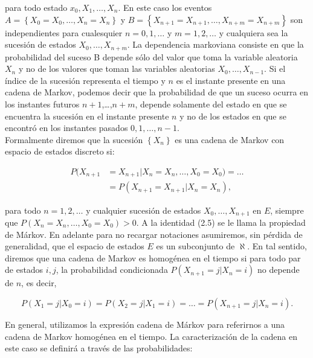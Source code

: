 		para todo estado  ${x}_{0}, X_{ 1 },\ldots , X_{ n }$. En este caso los eventos $A=\left\{  X_{ 0 }= X_{ 0 },\ldots , X_{ n }= X_{ n } \right\} $ y $B=\left\{  X_{ n+1 }= X_{ n+1 },\ldots , X_{ n+m }= X_{ n+m } \right\}$ son independientes para cualesquier $n=0,1,\ldots $ y $m=1,2,\ldots $ y cualquiera sea la sucesi\'{o}n de estados $ X_{ 0 },\ldots , X_{ n+m }$. La dependencia markoviana consiste en que la probabilidad del suceso B depende s\'{o}lo del valor que toma la variable aleatoria $ X_{ n }$ y no de los valores que toman las variables aleatorias $X_{ 0 },\ldots , X_{ n-1 }$. Si el \'{i}ndice de la sucesi\'{o}n representa el tiempo y $n$ es el instante presente en una cadena de Markov, podemos decir que la probabilidad de que un suceso ocurra en los instantes futuros $n+1$,\ldots ,$n+m$, depende solamente del estado en que se encuentra la sucesi\'{o}n en el instante presente $n$ y no de los estados en que se encontr\'{o} en los instantes pasados $0,1,\ldots ,n-1$.\\    
		Formalmente diremos que la sucesi\'{o}n $\left\{  X_{ n } \right\}$ es una cadena de Markov con espacio de estados discreto si:
		
		\begin{align}
			P( X_{ n+1 } & = X_{ n+1 }| X_{ n }= X_{ n },\ldots , X_{ 0 }= X_{ 0 })= \ldots  \nonumber \\
			&=P( X_{ n+1 }= X_{ n+1 }| X_{ n }= X_{ n }), \label{2.5}
		\end{align}
		
		para todo $n = 1,2,\ldots $ y cualquier sucesi\'{o}n de estados $ X_{ 0 },\ldots , X_{ n+1 }$ en $E$, siempre que $P( X_{ n }= X_{ n },\ldots , X_{ 0 }= X_{ 0 })>0$. A la identidad (2.5) se le llama la propiedad de M\'{a}rkov. En adelante para no recargar notaciones asumiremos, sin p\'{e}rdida de generalidad, que el espacio de estados $E$ es un subconjunto de $\aleph $.
		En tal sentido, diremos que una cadena de Markov es homog\'{e}nea en el tiempo si para todo par de estados $i,j$, la probabilidad condicionada $P( X_{ n+1 }=j| X_{ n }=i)$ no depende de $n$, es decir,
		
		\begin{equation}
			P( X_{ 1 }=j| X_{ 0 }=i) = P( X_{ 2 }=j| X_{ 1 }=i)=\ldots = P( X_{ n+1 }=j| X_{ n }=i). \label{2.6} 
		\end{equation}
		
		En general, utilizamos la expresi\'{o}n cadena de M\'{a}rkov para referirnos a una cadena de Markov homog\'{e}nea en el tiempo.
		La caracterizaci\'{o}n de la cadena en este caso se definir\'{a} a trav\'{e}s de las probabilidades:
		

